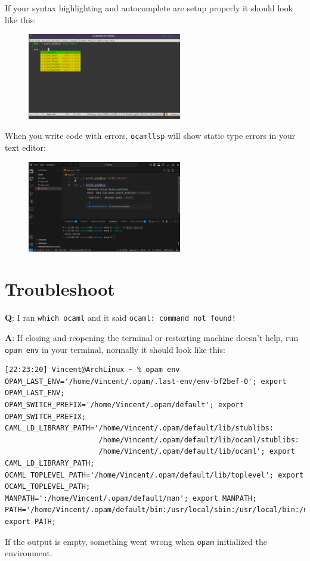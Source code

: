\documentclass{extarticle}
\begin{document}
If your syntax highlighting and autocomplete are setup properly it should look like this:
\begin{figure}[H]
  \centering
  \includegraphics[width=0.6\textwidth]{emacs_autocomplete.png}
\end{figure}

When you write code with errors, \texttt{ocamllsp} will show static type errors in your text editor:
\begin{figure}[H]
  \centering
  \includegraphics[width=0.6\textwidth]{static_check.png}
\end{figure}


\newpage
\section{Troubleshoot}\label{Troubleshoot}
\textbf{Q}: I ran \texttt{which ocaml} and it said \texttt{ocaml: command not found!}

\textbf{A}: If closing and reopening the terminal or restarting machine doesn't help,
run \texttt{opam env} in your terminal, normally it should look like this:
\begin{lstlisting}
[22:23:20] Vincent@ArchLinux ~ % opam env 
OPAM_LAST_ENV='/home/Vincent/.opam/.last-env/env-bf2bef-0'; export OPAM_LAST_ENV; 
OPAM_SWITCH_PREFIX='/home/Vincent/.opam/default'; export OPAM_SWITCH_PREFIX; 
CAML_LD_LIBRARY_PATH='/home/Vincent/.opam/default/lib/stublibs:
                      /home/Vincent/.opam/default/lib/ocaml/stublibs:
                      /home/Vincent/.opam/default/lib/ocaml'; export CAML_LD_LIBRARY_PATH; 
OCAML_TOPLEVEL_PATH='/home/Vincent/.opam/default/lib/toplevel'; export OCAML_TOPLEVEL_PATH; 
MANPATH=':/home/Vincent/.opam/default/man'; export MANPATH;
PATH='/home/Vincent/.opam/default/bin:/usr/local/sbin:/usr/local/bin:/usr/bin'; export PATH;
\end{lstlisting}
If the output is empty, something went wrong when \texttt{opam} initialized the environment.
\end{document}
